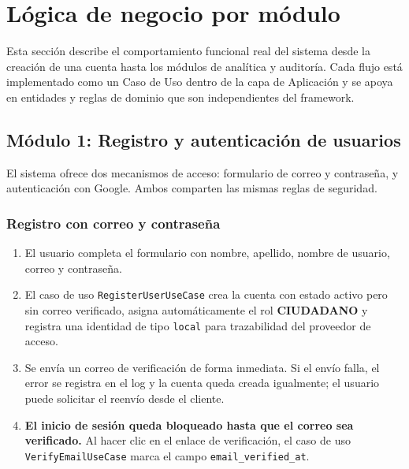 \documentclass[12pt,a4paper]{article}
\begin{document}
\section{Lógica de negocio por módulo}

Esta sección describe el comportamiento funcional real del sistema desde la creación
de una cuenta hasta los módulos de analítica y auditoría. Cada flujo está
implementado como un Caso de Uso dentro de la capa de Aplicación y se apoya
en entidades y reglas de dominio que son independientes del framework.

\subsection{Módulo 1: Registro y autenticación de usuarios}

El sistema ofrece dos mecanismos de acceso: formulario de correo y contraseña, y
autenticación con Google. Ambos comparten las mismas reglas de seguridad.

\subsubsection*{Registro con correo y contraseña}

\begin{enumerate}
    \item El usuario completa el formulario con nombre, apellido, nombre de usuario,
          correo y contraseña.
    \item El caso de uso \texttt{RegisterUserUseCase} crea la cuenta con estado
          activo pero sin correo verificado, asigna automáticamente el rol
          \textbf{CIUDADANO} y registra una identidad de tipo \texttt{local}
          para trazabilidad del proveedor de acceso.
    \item Se envía un correo de verificación de forma inmediata. Si el envío falla,
          el error se registra en el log y la cuenta queda creada igualmente; el
          usuario puede solicitar el reenvío desde el cliente.
    \item \textbf{El inicio de sesión queda bloqueado hasta que el correo sea verificado.}
          Al hacer clic en el enlace de verificación, el caso de uso
          \texttt{VerifyEmailUseCase} marca el campo \texttt{email\_verified\_at}.
\end{enumerate}
\end{document}
